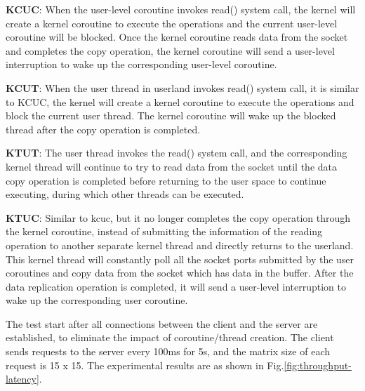 \documentclass[sigconf,review,anonymous]{acmart}
\begin{document}
\textbf{KCUC}: When the user-level coroutine invokes read() system call, the kernel will create a kernel coroutine to execute the operations and the current user-level coroutine will be blocked. Once the kernel coroutine reads data from the socket and completes the copy operation, the kernel coroutine will send a user-level interruption to wake up the corresponding user-level coroutine.
	
\textbf{KCUT}: When the user thread in userland invokes read() system call, it is similar to KCUC, the kernel will create a kernel coroutine to execute the operations and block the current user thread. The kernel coroutine will wake up the blocked thread after the copy operation is completed.
	
\textbf{KTUT}: The user thread invokes the read() system call, and the corresponding kernel thread will continue to try to read data from the socket until the data copy operation is completed before returning to the user space to continue executing, during which other threads can be executed.
	
\textbf{KTUC}: Similar to kcuc, but it no longer completes the copy operation through the kernel coroutine, instead of submitting the information of the reading operation to another separate kernel thread and directly returns to the userland. This kernel thread will constantly poll all the socket ports submitted by the user coroutines and copy data from the socket which has data in the buffer. After the data replication operation is completed, it will send a user-level interruption to wake up the corresponding user coroutine.


The test start after all connections between the client and the server are established, to eliminate the impact of coroutine/thread creation. The client sends requests to the server every 100ms for 5s, and the matrix size of each request is 15 x 15. The experimental results are as shown in Fig.\ref{fig:throughput-latency}.
\end{document}
